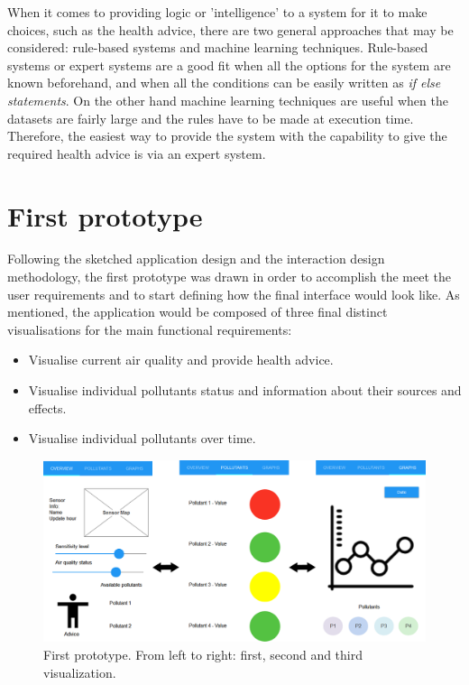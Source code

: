 When it comes to providing logic or 'intelligence' to a system for it to make choices, such as the health advice, there are two general approaches that may be considered: rule-based systems and machine learning techniques. Rule-based systems or expert systems are a good fit when all the options for the system are known beforehand, and when all the conditions can be easily written as \textit{if else statements}. On the other hand machine learning techniques are useful when the datasets are fairly large and the rules have to be made at execution time. Therefore, the easiest way to provide the system with the capability to give the required health advice is via an expert system.

\section{First prototype}
Following the sketched application design and the interaction design methodology, the first prototype was drawn in order to accomplish the meet the user requirements and to start defining how the final interface would look like. As mentioned, the application would be composed of three final distinct visualisations for the main functional requirements:

\begin{itemize}
    \item Visualise current air quality and provide health advice.
    \item Visualise individual pollutants status and information about their sources and effects.
    \item Visualise individual pollutants over time.
\end{itemize}


\begin{figure}[H]
\begin{adjustbox}{width=1.2\textwidth,center=\textwidth}
  \centering
  \includegraphics[scale=1]{images/firstPrototype.png}
\end{adjustbox}
  \caption[Frist prototype]{First prototype. From left to right: first, second and third visualization.}
  \label{fig:first_visualization_first_prototype}
\end{figure}


